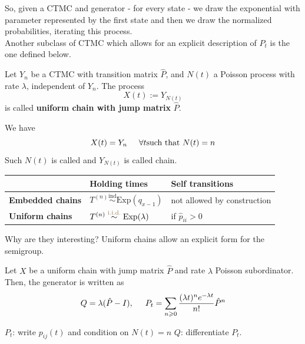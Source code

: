 \documentclass{article}
\begin{document}
So, given a CTMC and generator - for every state - we draw the exponential with parameter represented by the first state and then we draw the normalized probabilities, iterating this process.\\
Another subclass of CTMC which allows for an explicit description of $P_t$ is the one defined below.
\begin{definition}
	Let $Y_n$ be a CTMC with transition matrix $\hat{P}$, and $N(t)$ a Poisson process with rate $\lambda$, independent of $Y_n$. The process
	\begin{equation*}
		X(t) := Y_{N(t)}   
	\end{equation*}
	is called \textbf{uniform chain with jump matrix} $\hat{P}$.         
\end{definition}
\begin{figure}[H]
	\centering
	 
\end{figure}
We have 
\begin{equation*}
	X(t) = Y_n \hspace{0.5 cm} \forall t \text{such that } N(t) = n 
\end{equation*}
Such $N(t)$ is called  and $Y_{N(t)}$ is called  chain.
\begin{center}
	\begin{tabular}{m{2cm}|m{3.5cm}|m{3cm}}
		& \textbf{Holding times} & \textbf{Self transitions}  \\ \hline
		\textbf{Embedded chains} & $T^{(n)}\stackrel{\text{ind}}{\sim}\text{Exp}({q_{x-1}})$ & not allowed by construction\\ \hline
		\textbf{Uniform chains}&$T^{(n)}\stackrel{\text{\textcolor{Dandelion!50!black}{i.i.d.}}}{\sim}\text{Exp}(\lambda)$ & if $\hat{p}_{ii}>0$
	\end{tabular}
\end{center}
Why are they interesting? Uniform chains allow an explicit form for the semigroup. 
	\begin{proposition}
		Let $X$ be a uniform chain with jump matrix $\hat{P}$ and rate $\lambda$ Poisson subordinator. Then, the generator is written as
		\begin{equation*}
			Q = \lambda (\hat{P}-I), \hspace{0.5 cm} P_t = \sum_{n \geqslant 0} \frac{(\lambda t)^{n}e^{-\lambda t}}{n!} \hat{P}^n
		\end{equation*}
	\end{proposition}
\begin{proof2}
	$P_t$: write $p_{ij}(t)$ and condition on $N(t) = n$
	$Q$: differentiate $P_t$. 
\end{proof2}
\end{document}
